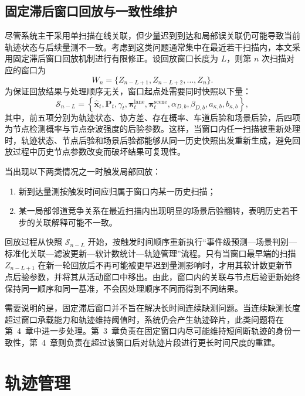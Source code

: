 \documentclass{xdupgthesis}
\begin{document}
\subsection{固定滞后窗口回放与一致性维护}
\label{subsec:ch3_replay_v2}

尽管系统主干采用单扫描在线关联，但少量迟到到达和局部误关联仍可能导致当前轨迹状态与后续量测不一致。考虑到这类问题通常集中在最近若干扫描内，本文采用固定滞后窗口回放机制进行有限修正。设回放窗口长度为 $L$，则第 $n$ 次扫描对应的窗口为
\begin{equation}
	W_n=\{Z_{n-L+1},Z_{n-L+2},\ldots,Z_n\}.
	\label{eq:ch3_window_v2}
\end{equation}
为保证回放结果与处理顺序无关，窗口起点处需要同时快照以下量：
\begin{equation}
	\mathcal S_{n-L}=
	\left\{
	\hat{\mathbf x}_t,\mathbf P_t,\gamma_t,\boldsymbol\pi_t^{\mathrm{lane}},\boldsymbol\pi_t^{\mathrm{scene}},\alpha_{D,b},\beta_{D,b},a_{\kappa,b},b_{\kappa,b}
	\right\},
	\label{eq:ch3_snapshot}
\end{equation}
其中，前五项分别为轨迹状态、协方差、存在概率、车道后验和场景后验，后四项为节点检测概率与节点杂波强度的后验参数。这样，当窗口内任一扫描被重新处理时，轨迹状态、节点后验和场景后验都能够从同一历史快照出发重新生成，避免回放过程中历史节点参数改变而破坏结果可复现性。

当出现以下两类情况之一时触发局部回放：
\begin{enumerate}
	\item 新到达量测按触发时间应归属于窗口内某一历史扫描；
	\item 某一局部邻道竞争关系在最近扫描内出现明显的场景后验翻转，表明历史若干步的关联解释可能不一致。
\end{enumerate}
回放过程从快照 $\mathcal S_{n-L}$ 开始，按触发时间顺序重新执行“事件级预测—场景判别—标准化关联—滤波更新—软计数统计—轨迹管理”流程。只有当窗口最早端的扫描 $Z_{n-L+1}$ 在新一轮回放后不再可能被更早迟到量测影响时，才用其软计数更新节点后验参数，并将其从活动窗口中移出。由此，窗口内的关联与节点后验更新始终保持同一顺序和同一基准，不会因处理顺序不同而得到不同结果。

需要说明的是，固定滞后窗口并不旨在解决长时间连续缺测问题。当连续缺测长度超过窗口承载能力和轨迹维持阈值时，系统仍会产生轨迹碎片，此类问题将在第~4~章中进一步处理。第~3~章负责在固定窗口内尽可能维持短间断轨迹的身份一致性，第~4~章则负责在超过该窗口后对轨迹片段进行更长时间尺度的重建。

\section{轨迹管理}
\label{sec:ch3_track_management}
\end{document}
